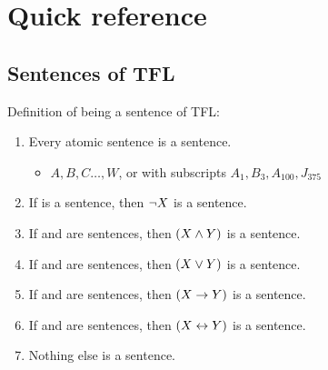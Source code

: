 \chapter{Quick reference}\label{glossary:quick ref}
\section{Sentences of TFL}
Definition of being a sentence of TFL:
	\begin{enumerate}
		\item Every atomic sentence is a sentence.
		\begin{itemize}
		\item $A,B,C\ldots,W$, or with subscripts $A_1, B_3, A_{100}, J_{375}$
		\end{itemize}
		\item If \metaX is a sentence, then $\neg X$ is a sentence.
		\item If \metaX and \metaY are sentences, then $(X\mathbin{\wedge}Y)$ is a sentence.
		\item If \metaX and \metaY are sentences, then $(X\vee Y)$ is a sentence.
		\item If \metaX and \metaY are sentences, then $(X\rightarrow Y)$ is a sentence.
		\item If \metaX and \metaY are sentences, then $(X\leftrightarrow Y)$ is a sentence.
		\item Nothing else is a sentence.
	\end{enumerate}
	
